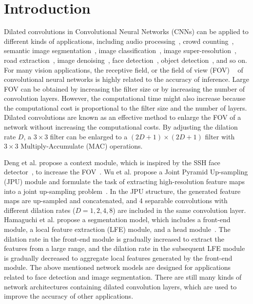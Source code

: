 \documentclass[10pt,twocolumn,letterpaper]{article}
\begin{document}
\section{Introduction}
\label{sec:introduction}

Dilated convolutions in Convolutional Neural Networks (CNNs) can be applied to different kinds of applications, including audio processing~\cite{Hussain19}, crowd counting~\cite{Li18_0}, semantic image segmentation~\cite{Hamaguchi17,Mehta18,Wang18,Wu19}, image classification~\cite{Lei19}, image super-resolution~\cite{Lin18}, road extraction~\cite{Zhou18}, image denoising~\cite{Tian18}, face detection~\cite{Li18_1}, object detection~\cite{Li18_2}, and so on. For many vision applications, the receptive field, or the field of view (FOV) ~\cite{Luo17} of convolutional neural networks is highly related to the accuracy of inference. Large FOV can be obtained by increasing the filter size or by increasing the number of convolution layers. However, the computational time might also increase because the computational cost is proportional to the filter size and the number of layers. Dilated convolutions are known as an effective method to enlarge the FOV of a network without increasing the computational costs. By adjusting the dilation rate $D$, a $3 \times 3$ filter can be enlarged to a $(2D + 1) \times (2D + 1)$ filter with $3 \times 3$ Multiply-Accumulate (MAC) operations.

Deng et al. propose a context module, which is inspired by the SSH face detector~\cite{Najibi17}, to increase the FOV~\cite{Deng19}. Wu et al. propose a Joint Pyramid Up-sampling (JPU) module and formulate the task of extracting high-resolution feature maps into a joint up-sampling problem~\cite{Wu19}. In the JPU structure, the generated feature maps are up-sampled and concatenated, and 4 separable convolutions with different dilation rates ($D = 1, 2, 4, 8$) are included in the same convolution layer. Hamaguchi et al. propose a segmentation model, which includes a front-end module, a local feature extraction (LFE) module, and a head module~\cite{Hamaguchi17}. The dilation rate in the front-end module is gradually increased to extract the features from a large range, and the dilation rate in the subsequent LFE module is gradually decreased to aggregate local features generated by the front-end module. The above mentioned network models are designed for applications related to face detection and image segmentation. There are still many kinds of network architectures containing dilated convolution layers, which are used to improve the accuracy of other applications.
\end{document}
